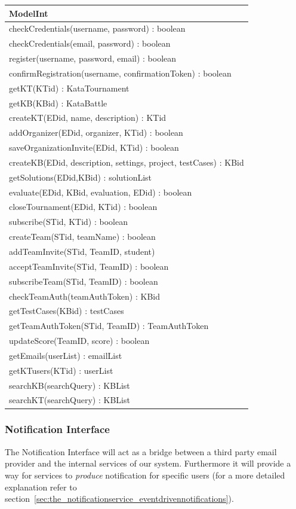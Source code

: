 \documentclass[11pt]{report}
\begin{document}
\cleardoublepage
\begin{longtable}[h] {|p{130mm}|}
\hline
\textbf{ModelInt} \\ \hline
checkCredentials(username, password) : boolean \\
checkCredentials(email, password) : boolean \\
register(username, password, email) : boolean \\
confirmRegistration(username, confirmationToken) : boolean \\
getKT(KTid) : KataTournament \\
getKB(KBid) : KataBattle \\
createKT(EDid, name, description) : KTid \\
addOrganizer(EDid, organizer, KTid) : boolean\\
saveOrganizationInvite(EDid, KTid) : boolean\\
createKB(EDid, description, settings, project, testCases) : KBid \\
getSolutions(EDid,KBid) : solutionList \\
evaluate(EDid, KBid, evaluation, EDid) : boolean \\
closeTournament(EDid, KTid) : boolean \\
subscribe(STid, KTid) : boolean\\
createTeam(STid, teamName) : boolean \\
addTeamInvite(STid, TeamID, student) \\
acceptTeamInvite(STid, TeamID) : boolean \\
subscribeTeam(STid, TeamID) : boolean \\
checkTeamAuth(teamAuthToken) : KBid \\
getTestCases(KBid) : testCases \\
getTeamAuthToken(STid, TeamID) : TeamAuthToken \\
updateScore(TeamID, score) : boolean \\
getEmails(userList) : emailList \\
getKTusers(KTid) : userList \\
searchKB(searchQuery) : KBList \\
searchKT(searchQuery) : KBList \\
\hline
\end{longtable}

\cleardoublepage
\subsubsection{Notification Interface}
The Notification Interface will act as a bridge between a third party email provider and the internal services of our system.
Furthermore it will provide a way for services to \emph{produce} notification for specific users (for a more detailed explanation refer to section~\ref{sec:the_notificationservice_eventdrivennotifications}).
\end{document}
